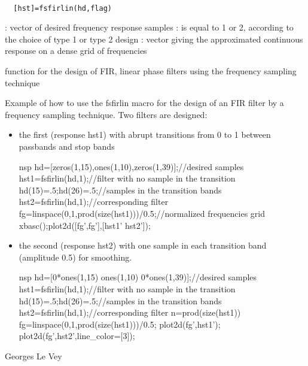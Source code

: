 \begin{mandesc}
   \\ %
\end{mandesc}
\begin{calling_sequence}
\begin{verbatim}
  [hst]=fsfirlin(hd,flag)  
\end{verbatim}
\end{calling_sequence}
\begin{parameters}
  \begin{varlist}
    : vector of desired frequency response samples
    : is equal to 1 or 2, according to the choice of type 1 or type 2 design
    : vector giving the approximated continuous response on a dense grid of frequencies
  \end{varlist}
\end{parameters}
\begin{mandescription}
  function for the design of FIR, linear phase filters
  using the frequency sampling technique
\end{mandescription}
\begin{examples}
  Example of how to use the fsfirlin macro for the design 
  of an FIR filter by a frequency sampling technique.
  Two filters are designed: 
  \begin{itemize}
  \item the first (response hst1) with 
    abrupt transitions from 0 to 1 between passbands and stop 
    bands
    \begin{mintednsp}{nsp}
      hd=[zeros(1,15),ones(1,10),zeros(1,39)];//desired samples
      hst1=fsfirlin(hd,1);//filter with no sample in the transition
      hd(15)=.5;hd(26)=.5;//samples in the transition bands
      hst2=fsfirlin(hd,1);//corresponding filter
      fg=linspace(0,1,prod(size(hst1)))/0.5;//normalized frequencies grid
      xbasc();plot2d([fg',fg'],[hst1' hst2']);
    \end{mintednsp}
  \item the second (response hst2) with one sample in each 
    transition band (amplitude 0.5) for smoothing.
    \begin{mintednsp}{nsp}
      hd=[0*ones(1,15) ones(1,10) 0*ones(1,39)];//desired samples
      hst1=fsfirlin(hd,1);//filter with no sample in the transition
      hd(15)=.5;hd(26)=.5;//samples in the transition bands
      hst2=fsfirlin(hd,1);//corresponding filter
      n=prod(size(hst1))
      fg=linspace(0,1,prod(size(hst1)))/0.5;
      plot2d(fg',hst1');
      plot2d(fg',hst2',line_color=[3]);
    \end{mintednsp}
  \end{itemize}
\end{examples}
\begin{manseealso}
     
\end{manseealso}
\begin{authors}
  Georges Le Vey
\end{authors}
